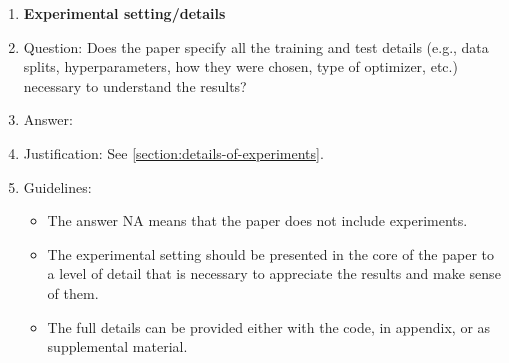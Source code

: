\documentclass{article}
\theoremstyle{plain}
\theoremstyle{remark}
\begin{document}
\begin{enumerate}
\item {\bf Experimental setting/details}
    \item[] Question: Does the paper specify all the training and test details (e.g., data splits, hyperparameters, how they were chosen, type of optimizer, etc.) necessary to understand the results?
    \item[] Answer: \answerYes{} %
    \item[] Justification: See \cref{section:details-of-experiments}.
    \item[] Guidelines:
    \begin{itemize}
        \item The answer NA means that the paper does not include experiments.
        \item The experimental setting should be presented in the core of the paper to a level of detail that is necessary to appreciate the results and make sense of them.
        \item The full details can be provided either with the code, in appendix, or as supplemental material.
    \end{itemize}


\end{enumerate}
\end{document}
